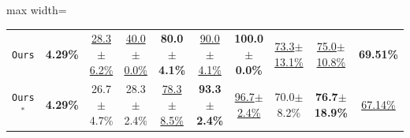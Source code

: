 \begin{table}[H]
\begin{adjustbox}{max width=\textwidth}
\begin{tabular}{ccccc|ccccc}
  \rowcolor{hclbrown!8!white}
  \texttt{Ours}
  & \textbf{4.29\%}
  & \underline{28.3$\pm$6.2\%}
  & \underline{40.0$\pm$0.0\%}
  & \textbf{80.0$\pm$4.1\%}
  & \underline{90.0$\pm$4.1\%}
  & \textbf{100.0$\pm$0.0\%}
  & \underline{73.3$\pm$13.1\%}
  & \underline{75.0$\pm$10.8\%}
  & \textbf{69.51\%} \\


  \rowcolor{hclbrown!15!white}
  \texttt{Ours}$^{*}$
  & \textbf{4.29\%}
  & 26.7$\pm$4.7\%
  & 28.3$\pm$2.4\%
  & \underline{78.3$\pm$8.5\%}
  & \textbf{93.3$\pm$2.4\%}
  & \underline{96.7$\pm$2.4\%}
  & 70.0$\pm$8.2\%
  & \textbf{76.7$\pm$18.9\%}
  & \underline{67.14\%} \\

  \bottomrule
  \end{tabular}
  \end{adjustbox}
\end{table}
